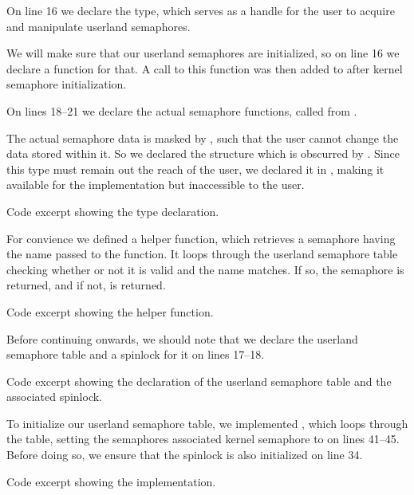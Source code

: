 On line 16 we declare the  type, which serves as a handle
for the user to acquire and manipulate userland semaphores.

We will make sure that our userland semaphores are initialized, so on line
16 we declare a function for that. A call to this function was then added to
 after kernel semaphore initialization.

On lines 18--21 we declare the actual semaphore functions, called from
.

The actual semaphore data is masked by , such that the user
cannot change the data stored within it. So we declared the structure
 which is obscurred by . Since this type must
remain out the reach of the user, we declared it in ,
making it available for the implementation but inaccessible to the user.

{Code excerpt showing the  type declaration.}

For convience we defined a helper function, which retrieves a semaphore having
the name passed to the function. It loops through the userland semaphore table
checking whether or not it is valid and the name matches. If so, the semaphore
is returned, and if not,  is returned.

{Code excerpt showing the  helper function.}

Before continuing onwards, we should note that we declare the userland semaphore
table and a spinlock for it on lines 17--18.

{Code excerpt showing the declaration of the userland semaphore table and the
associated spinlock.}

To initialize our userland semaphore table, we implemented
, which loops through the table, setting the
semaphores associated kernel semaphore to  on lines 41--45. Before
doing so, we ensure that the spinlock is also initialized on line 34.

{Code excerpt showing the  implementation.}

